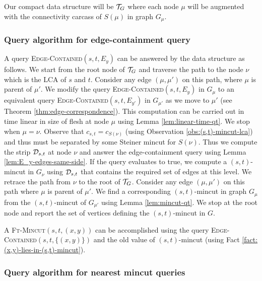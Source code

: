 Our compact data structure will be ${\cal T}_G$ where each node $\mu$ will be augmented with the connectivity carcass of $S(\mu)$ in graph $G_\mu$. 

\subsubsection*{Query algorithm for edge-containment query}

A query \textsc{Edge-Contained}$(s,t,E_y)$ can be answered by the data structure as follows. We start from the root node of ${\cal T}_G$ and traverse the path to the node $\nu$ which is the LCA of $s$ and $t$. Consider any edge $(\mu,\mu')$ on this path, where $\mu$ is parent of $\mu'$. We modify the query \textsc{Edge-Contained}$(s,t,E_y)$ in $G_{\mu}$ to an equivalent query \textsc{Edge-Contained}$(s,t,E_{y'})$ in $G_{\mu'}$ as we move to $\mu'$ (see Theorem \ref{thm:edge-correspondence}). This computation can be carried out in time linear in size of flesh at node $\mu$ using Lemma \ref{lem:linear-time-qt}. We stop when $\mu = \nu$. Observe that $c_{s,t} = c_{S(\nu)}$ (using Observation \ref{obs:(s,t)-mincut-lca}) and thus must be separated by some Steiner mincut for $S(\nu)$.
Thus we compute the strip ${\cal D}_{s,t}$ at node $\nu$ and answer the edge-containment query using Lemma \ref{lem:E_y-edges-same-side}. If the query evaluates to true, we compute a $(s,t)$-mincut in $G_\nu$ using ${\cal D}_{s,t}$ that contains the required set of edges at this level. We retrace the path from $\nu$ to the root of ${\cal T}_G$.
Consider any edge $(\mu,\mu')$ on this path where $\mu$ is parent of $\mu'$. We find a corresponding $(s,t)$-mincut in graph $G_\mu$ from the $(s,t)$-mincut of $G_{\mu'}$ using Lemma \ref{lem:mincut-qt}. We stop at the root node and report the set of vertices defining the $(s,t)$-mincut in $G$.

A \textsc{Ft-Mincut}$(s,t,(x,y))$ can be accomplished using the query \textsc{Edge-Contained}$(s,t,\{(x,y)\})$ and the old value of $(s,t)$-mincut (using Fact \ref{fact:(x,y)-lies-in-(s,t)-mincut}).

\subsubsection*{Query algorithm for nearest mincut queries}

